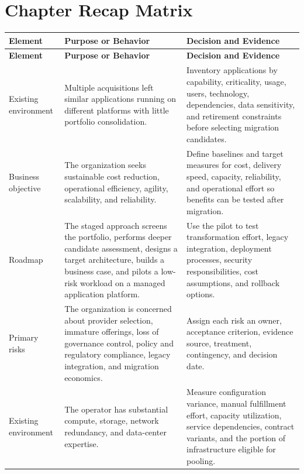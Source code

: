 \documentclass[11pt]{article}
\begin{document}
\section{Chapter Recap Matrix}
\begingroup\small\setlength{\tabcolsep}{4pt}
\begin{longtable}{@{}>{\RaggedRight\arraybackslash}p{}>{\RaggedRight\arraybackslash}p{}>{\RaggedRight\arraybackslash}p{}@{}}
\toprule\rowcolor{Navy}\color{white}\textbf{Element} & \color{white}\textbf{Purpose or Behavior} & \color{white}\textbf{Decision and Evidence}\\\midrule\endfirsthead
\toprule\rowcolor{Navy}\color{white}\textbf{Element} & \color{white}\textbf{Purpose or Behavior} & \color{white}\textbf{Decision and Evidence}\\\midrule\endhead
Existing environment & Multiple acquisitions left similar applications running on different platforms with little portfolio consolidation. & Inventory applications by capability, criticality, usage, users, technology, dependencies, data sensitivity, and retirement constraints before selecting migration candidates. \\\midrule
Business objective & The organization seeks sustainable cost reduction, operational efficiency, agility, scalability, and reliability. & Define baselines and target measures for cost, delivery speed, capacity, reliability, and operational effort so benefits can be tested after migration. \\\midrule
Roadmap & The staged approach screens the portfolio, performs deeper candidate assessment, designs a target architecture, builds a business case, and pilots a low-risk workload on a managed application platform. & Use the pilot to test transformation effort, legacy integration, deployment processes, security responsibilities, cost assumptions, and rollback options. \\\midrule
Primary risks & The organization is concerned about provider selection, immature offerings, loss of governance control, policy and regulatory compliance, legacy integration, and migration economics. & Assign each risk an owner, acceptance criterion, evidence source, treatment, contingency, and decision date. \\\midrule
Existing environment & The operator has substantial compute, storage, network redundancy, and data-center expertise. & Measure configuration variance, manual fulfillment effort, capacity utilization, service dependencies, contract variants, and the portion of infrastructure eligible for pooling. \\\midrule

\end{longtable}
\end{document}
